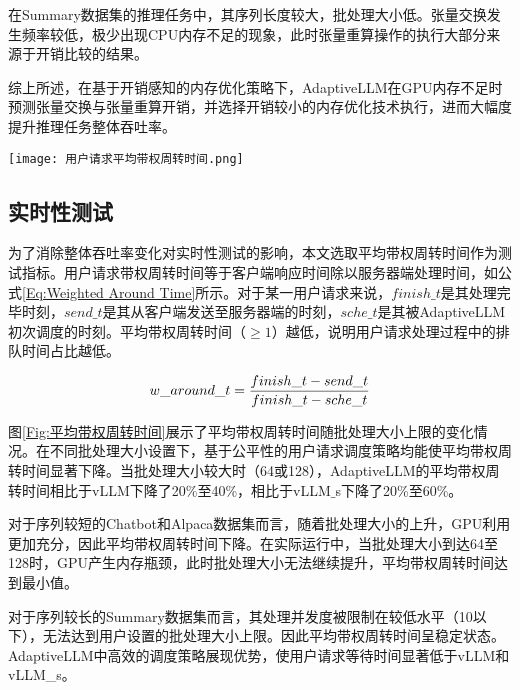 在Summary数据集的推理任务中，其序列长度较大，批处理大小低。张量交换发生频率较低，极少出现CPU内存不足的现象，此时张量重算操作的执行大部分来源于开销比较的结果。

综上所述，在基于开销感知的内存优化策略下，AdaptiveLLM在GPU内存不足时预测张量交换与张量重算开销，并选择开销较小的内存优化技术执行，进而大幅度提升推理任务整体吞吐率。 

\begin{figure*}[!htbp]
  \centering
  \texttt{[image: 用户请求平均带权周转时间.png]}
  \caption{用户请求平均带权周转时间}
  \label{Fig:平均带权周转时间}
\end{figure*}

\subsection{实时性测试}

为了消除整体吞吐率变化对实时性测试的影响，本文选取平均带权周转时间作为测试指标。用户请求带权周转时间等于客户端响应时间除以服务器端处理时间，如公式\ref{Eq:Weighted Around Time}所示。对于某一用户请求来说，$finish\_t$是其处理完毕时刻，$send\_t$是其从客户端发送至服务器端的时刻，$sche\_t$是其被AdaptiveLLM初次调度的时刻。平均带权周转时间（$\geq 1$）越低，说明用户请求处理过程中的排队时间占比越低。 

\begin{equation}
  \begin{aligned}
    w\_around\_t = \frac{finish\_t - send\_t}{finish\_t - sche\_t}
  \end{aligned}
  \label{Eq:Weighted Around Time}
  \setlength{\abovedisplayskip}{0ex}
  \setlength{\belowdisplayskip}{2ex}
\end{equation}


图\ref{Fig:平均带权周转时间}展示了平均带权周转时间随批处理大小上限的变化情况。在不同批处理大小设置下，基于公平性的用户请求调度策略均能使平均带权周转时间显著下降。当批处理大小较大时（64或128），AdaptiveLLM的平均带权周转时间相比于vLLM下降了20\%至40\%，相比于vLLM$\_$s下降了20\%至60\%。

对于序列较短的Chatbot和Alpaca数据集而言，随着批处理大小的上升，GPU利用更加充分，因此平均带权周转时间下降。在实际运行中，当批处理大小到达64至128时，GPU产生内存瓶颈，此时批处理大小无法继续提升，平均带权周转时间达到最小值。

对于序列较长的Summary数据集而言，其处理并发度被限制在较低水平（10以下），无法达到用户设置的批处理大小上限。因此平均带权周转时间呈稳定状态。AdaptiveLLM中高效的调度策略展现优势，使用户请求等待时间显著低于vLLM和vLLM\_s。

